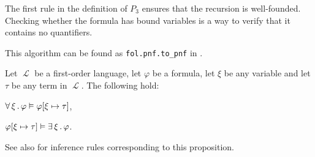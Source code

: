 \begin{comments}
  \item The first rule in the definition of \( P_3 \) ensures that the recursion is well-founded. Checking whether the formula has bound variables is a way to verify that it contains no quantifiers.
  \item This algorithm can be found as \texttt{fol.pnf.to\_pnf} in \cite{code}.
\end{comments}

\begin{proposition}\label{thm:quantifier_satisfiability}
  Let \( \mscrL \) be a first-order language, let \( \varphi \) be a formula, let \( \xi \) be any variable and let \( \tau \) be any term in \( \mscrL \). The following hold:

  \begin{thmenum}
     \( \forall \thinspace \xi \thinspace . \thinspace \varphi \vDash \varphi[\xi \mapsto \tau] \),

     \( \varphi[\xi \mapsto \tau] \vDash \exists \thinspace \xi \thinspace . \thinspace \varphi \).
  \end{thmenum}
\end{proposition}
\begin{comments}
  \item See also  for inference rules corresponding to this proposition.
\end{comments}
